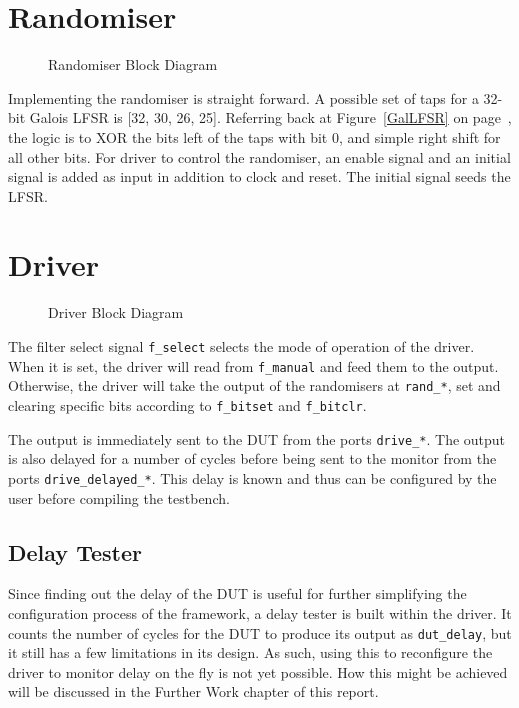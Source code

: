 \section{Randomiser}

\begin{figure}[H]
  \centering
  
  \caption{Randomiser Block Diagram}
  \label{RandomiserBlk}
\end{figure}

Implementing the randomiser is straight forward.
A possible set of taps for a 32-bit Galois LFSR is [32, 30, 26, 25].
Referring back at Figure~\ref{GalLFSR} on page~\pageref{GalLFSR},
the logic is to XOR the bits left of the taps with bit 0, and simple right shift for all other bits.
For driver to control the randomiser, an enable signal and an initial signal is added as input in addition to clock and reset.
The initial signal seeds the LFSR.

\section{Driver}

\begin{figure}[H]
  \centering
  
  \caption{Driver Block Diagram}
  \label{DriverBlk}
\end{figure}

The filter select signal \texttt{f\_select} selects the mode of operation of the driver.
When it is set, the driver will read from \texttt{f\_manual} and feed them to the output.
Otherwise, the driver will take the output of the randomisers at \texttt{rand\_*}, set and clearing specific bits according to \texttt{f\_bitset} and \texttt{f\_bitclr}.

The output is immediately sent to the DUT from the ports \texttt{drive\_*}.
The output is also delayed for a number of cycles before being sent to the monitor from the ports \texttt{drive\_delayed\_*}.
This delay is known and thus can be configured by the user before compiling the testbench.

\subsection{Delay Tester}

Since finding out the delay of the DUT is useful for further simplifying the configuration process of the framework, a delay tester is built within the driver.
It counts the number of cycles for the DUT to produce its output as \texttt{dut\_delay}, but it still has a few limitations in its design.
As such, using this to reconfigure the driver to monitor delay on the fly is not yet possible.
How this might be achieved will be discussed in the Further Work chapter of this report.

